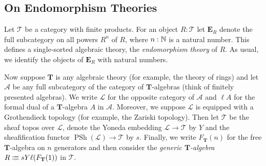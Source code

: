 {
\newcommand{\cat}[1]{\mathcal{#1}}
\newcommand{\theory}[1]{\mathbf{#1}}
\newcommand{\Psh}{\mathop{PSh}}
\newcommand{\Set}{\mathsf{Set}}

\subsection{On Endomorphism Theories}

\begin{definition}
Let \(\cat T\) be a category with finite products.
For an object \(R:\cat T\) let \(\theory E_R\) denote the full subcategory on all powers \(R^n\) of \(R\), where \(n:\mathbb{N}\) is a natural number.
This defines a single-sorted algebraic theory, the \emph{endomorphism theory} of \(R\).
As usual, we identify the objects of \(\theory E_R\) with natural numbers.
\end{definition}


Now suppose \(\theory T\) is any algebraic theory (for example, the theory of rings) and let \(\cat A\) be any full subcategory of the category of \(\theory T\)-algebras (think of finitely presented algebras).
We write \(\cat L\) for the opposite category of \(\cat A\) and \(\ell A\) for the formal dual of a \(\theory T\)-algebra \(A\) in \(\cat A\).
Moreover, we suppose \(\cat L\) is equipped with a Grothendieck topology (for example, the Zariski topology).
Then let \(\cat T\) be the sheaf topos over \(\cat L\), denote the Yoneda embedding \(\cat L\to\cat T\) by \(Y\) and the sheafification functor \(\Psh(\cat L)\to\cat T\) by \(s\).
Finally, we write \(F_\theory T(n)\) for the free \(\theory T\)-algebra on \(n\) generators and then consider the \emph{generic \(\theory T\)-algebra} \(R\colonequiv sY\ell(F_{\theory T}(1))\) in \(\cat T\).

}
